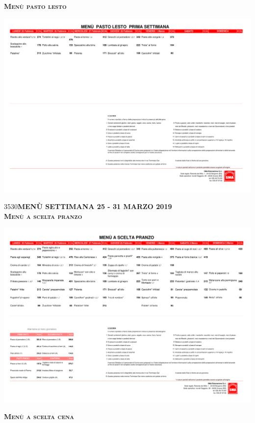 \documentclass{article}
\makeatletter
\newcommand\HUGE{\@setfontsize\Huge{35}{30}}
\newcommand{\frasecinque}{MENÙ SETTIMANA 25 - 31 MARZO 2019}
\makeatother
\begin{document}
\begin{center}
{\Huge \textbf{\textsc{Menù pasto lesto}}}\\
\end{center}
\includegraphics[trim=0cm 23cm 0cm 2cm,clip,page=4,width=\textwidth,]{lesto.pdf}
\newpage
\begin{center}
{\HUGE \color{red}\textbf{\frasecinque}}\\
\vspace{0.7cm}
{\Huge \textbf{\textsc{Menù a scelta pranzo}}}\\
\end{center}
\includegraphics[trim=0cm 15.7cm 0cm 2.7cm,clip,page=9,width=\textwidth,]{scelta.pdf}
\vspace{0.3cm}
\begin{center}
{\Huge \textbf{\textsc{Menù a scelta cena}}}\\
\end{center}
\end{document}
